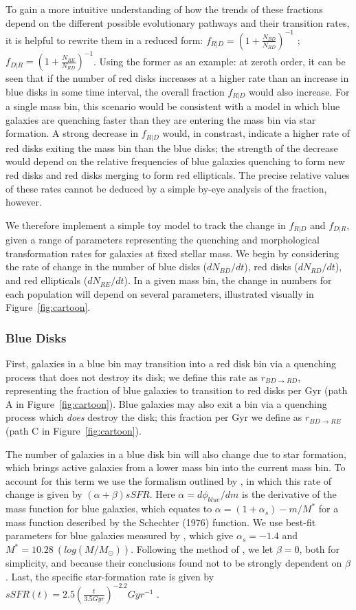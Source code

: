 To gain a more intuitive understanding of how the trends of these fractions depend on the different possible evolutionary pathways and their transition rates, it is helpful to rewrite them in a reduced form: $f_{R|D} = ({1+\frac{N_{BD}}{N_{RD}}})^{-1}$ ; $f_{D|R} = ({1+\frac{N_{RE}}{N_{RD}}})^{-1}$. Using the former as an example: at zeroth order, it can be seen that if the number of red disks increases at a higher rate than an increase in blue disks in some time interval, the overall fraction $f_{R|D}$ would also increase. For a single mass bin, this scenario would be consistent with a model in which blue galaxies are quenching faster than they are entering the mass bin via star formation. A strong decrease in $f_{R|D}$ would, in constrast, indicate a higher rate of red disks exiting the mass bin than the blue disks; the strength of the decrease would depend on the relative frequencies of blue galaxies quenching to form new red disks and red disks merging to form red ellipticals. The precise relative values of these rates cannot be deduced by a simple by-eye analysis of the fraction, however.

We therefore implement a simple toy model to track the change in $f_{R|D}$ and $f_{D|R}$, given a range of parameters representing the quenching and morphological transformation rates for galaxies at fixed stellar mass. We begin by considering the rate of change in the number of blue disks ($dN_{BD}/dt$), red disks ($dN_{RD}/dt$), and red ellipticals ($dN_{RE}/dt$). In a given mass bin, the change in numbers for each population will depend on several parameters, illustrated visually in Figure~\ref{fig:cartoon}.

\subsubsection{Blue Disks}
First, galaxies in a blue bin may transition into a red disk bin via a quenching process that does not destroy its disk; we define this rate as $r_{BD \rightarrow RD}$, representing the fraction of blue galaxies to transition to red disks per Gyr (path A in Figure~\ref{fig:cartoon}). Blue galaxies may also exit a bin via a quenching process which \emph{does} destroy the disk; this fraction per Gyr we define as $r_{BD \rightarrow RE}$ (path C in Figure~\ref{fig:cartoon}).

The number of galaxies in a blue disk bin will also change due to star formation, which brings active galaxies from a lower mass bin into the current mass bin. To account for this term we use the formalism outlined by \citet{Peng2010}, in which this rate of change is given by $(\alpha + \beta)sSFR$. Here $\alpha = d\phi_{blue}/dm$ is the derivative of the mass function for blue galaxies, which equates to $\alpha = (1+\alpha_s) - m/M^*$ for a mass function described by the Schechter (1976) function. We use best-fit parameters for blue galaxies measured by \citep{Ichikawa2017}, which give $\alpha_s = -1.4$ and $M^* = 10.28 ~(log(M/M_{\odot}))$. Following the method of \citet{Peng2010}, we let $\beta=0$, both for simplicity, and because their conclusions found not to be strongly dependent on $\beta$. Last, the specific star-formation rate is given by $sSFR(t) = 2.5(\frac{t}{3.5 Gyr})^{-2.2}Gyr^{-1}$ \citep{Peng2010}.

